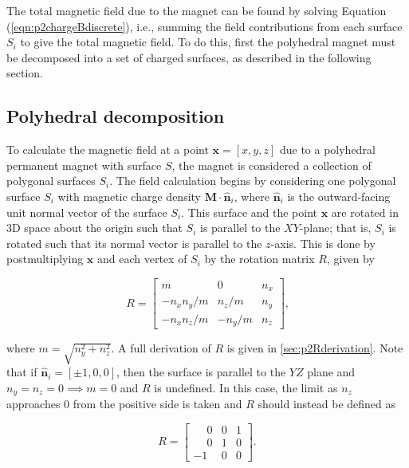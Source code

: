 The total magnetic field due to the magnet can be found by solving Equation (\ref{eqn:p2chargeBdiscrete}), i.e., summing the field contributions from each surface \(S_{\!i}\) to give the total magnetic field. To do this, first the polyhedral magnet must be decomposed into a set of charged surfaces, as described in the following section.

\subsection{Polyhedral decomposition}\label{sec:p2polyhedrondecomposition}

To calculate the magnetic field at a point \(\mathbf{x} = \left[ x, y, z\right]\) due to a polyhedral permanent magnet with surface \(S\), the magnet is considered a collection of polygonal surfaces \(S_{\!i}\). The field calculation begins by considering one polygonal surface \(S_{\!i}\) with magnetic charge density \(\mathbf{M} \cdot \hat{\mathbf{n}}_i\), where \(\hat{\mathbf{n}}_i\) is the outward-facing unit normal vector of the surface \(S_{\!i}\). This surface and the point \(\mathbf{x}\) are rotated in 3D space about the origin such that \(S_{\!i}\) is parallel to the \(XY\)-plane; that is, \(S_{\!i}\) is rotated such that its normal vector is parallel to the \(z\)-axis. This is done by postmultiplying \(\mathbf{x}\) and each vertex of \(S_{\!i}\) by the rotation matrix \(R\), given by

\begin{equation}
R = \begin{bmatrix}
m & 0 & n_x \\[4pt]
-n_xn_y/m & n_z/m & n_y \\[4pt]
-n_xn_z/m & -n_y/m & n_z
\end{bmatrix} \text{,}
\end{equation}

\noindent where \(m = \sqrt{n_y^2+n_z^2}\). A full derivation of \(R\) is given in \ref{sec:p2Rderivation}. Note that if \(\hat{\mathbf{n}}_i = \left[\pm1,0,0\right]\), then the surface is parallel to the \(YZ\) plane and \(n_y = n_z = 0 \implies m = 0\) and \(R\) is undefined. In this case, the limit as \(n_z\) approaches 0 from the positive side is taken and \(R\) should instead be defined as

\begin{equation}
R = \begin{bmatrix}
\phantom{-}0 & 0 & 1 \\
\phantom{-}0 & 1 & 0 \\
-1 & 0 & 0 \end{bmatrix} \text{.}
\end{equation}

